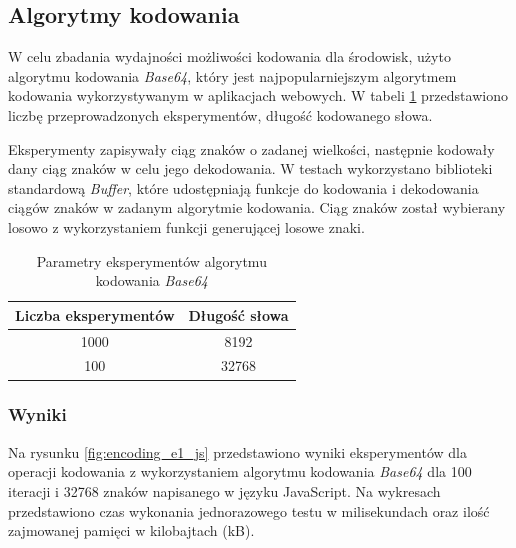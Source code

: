 \subsection{Algorytmy kodowania}
W celu zbadania wydajności możliwości kodowania dla środowisk, użyto algorytmu kodowania \textit{Base64}, który jest najpopularniejszym algorytmem kodowania wykorzystywanym w aplikacjach webowych. W tabeli \ref{tab:encoding_experiments} przedstawiono liczbę przeprowadzonych eksperymentów, długość kodowanego słowa.

Eksperymenty zapisywały ciąg znaków o zadanej wielkości, następnie kodowały dany ciąg znaków w celu jego dekodowania. W testach wykorzystano biblioteki standardową \textit{Buffer}, które udostępniają funkcje do kodowania i dekodowania ciągów znaków w zadanym algorytmie kodowania. Ciąg znaków został wybierany losowo z wykorzystaniem funkcji generującej losowe znaki.

\begin{table}[H]
  \centering
  \caption{Parametry eksperymentów algorytmu kodowania \textit{Base64} \cite{cryptoeprint:2022/361}}
  \begin{tabular}{|c|c|}
    \hline
    \textbf{Liczba eksperymentów} & \textbf{Długość słowa}\\ \hline
    1000 & 8192 \\ \hline
    100 & 32768 \\ \hline
  \end{tabular}
  \label{tab:encoding_experiments}
\end{table}

\subsubsection{Wyniki}
Na rysunku \ref{fig:encoding_e1_js} przedstawiono wyniki eksperymentów dla operacji kodowania z wykorzystaniem algorytmu kodowania \textit{Base64} dla 100 iteracji i 32768 znaków napisanego w języku JavaScript. Na wykresach przedstawiono czas wykonania jednorazowego testu w milisekundach oraz ilość zajmowanej pamięci w kilobajtach (kB).

